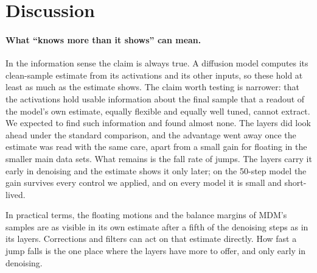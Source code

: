 \section{Discussion}
\label{sec:discussion}

\paragraph{What ``knows more than it shows'' can mean.} In the information sense the claim is always true. A diffusion model computes its clean-sample estimate from its activations and its other inputs, so these hold at least as much as the estimate shows. The claim worth testing is narrower: that the activations hold usable information about the final sample that a readout of the model's own estimate, equally flexible and equally well tuned, cannot extract. We expected to find such information and found almost none. The layers did look ahead under the standard comparison, and the advantage went away once the estimate was read with the same care, apart from a small gain for floating in the smaller main data sets. What remains is the fall rate of jumps. The layers carry it early in denoising and the estimate shows it only later; on the 50-step model the gain survives every control we applied, and on every model it is small and short-lived.

In practical terms, the floating motions and the balance margins of MDM's samples are as visible in its own estimate after a fifth of the denoising steps as in its layers. Corrections and filters can act on that estimate directly. How fast a jump falls is the one place where the layers have more to offer, and only early in denoising.

